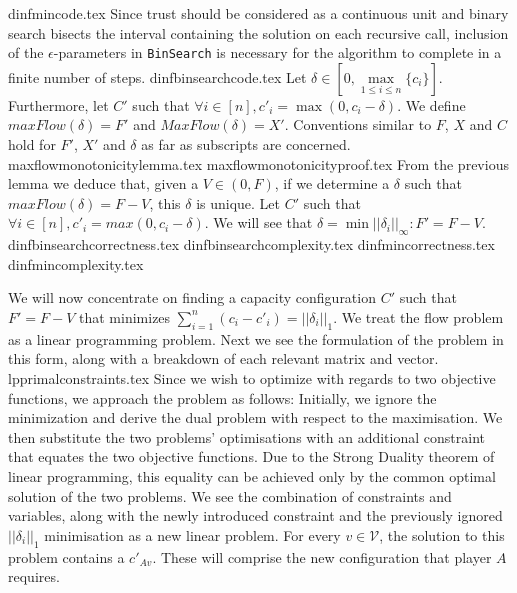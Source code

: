 \documentclass[11pt]{llncs}
\begin{document}
  {dinfmincode.tex}
  Since trust should be considered as a continuous unit and binary search bisects the interval containing the solution
  on each recursive call, inclusion of the $\epsilon$-parameters in \texttt{BinSearch} is necessary for the algorithm to
  complete in a finite number of steps.
  {dinfbinsearchcode.tex}
  Let $\delta \in [0, \max\limits_{1 \leq i \leq n}{\{c_i\}}]$. Furthermore, let $C'$ such that
  $\forall i \in [n], c'_i = \max{\left(0, c_i - \delta\right)}$. We define $maxFlow\left(\delta\right) = F'$ and
  $MaxFlow\left(\delta\right) = X'$. Conventions similar to $F$, $X$ and $C$ hold for $F'$, $X'$ and $\delta$ as far as
  subscripts are concerned.
  {maxflowmonotonicitylemma.tex}
  {maxflowmonotonicityproof.tex}
  From the previous lemma we deduce that, given a $V \in \left(0, F\right)$, if we determine a $\delta$ such that
  $maxFlow\left(\delta\right) = F - V$, this $\delta$ is unique. Let $C'$ such that
  $\forall i \in [n], c'_i = max{\left(0, c_i - \delta\right)}$. We will see that
  $\delta = \min{||\delta_i||_\infty} : F' = F - V$.
  {dinfbinsearchcorrectness.tex}
  {dinfbinsearchcomplexity.tex}
  {dinfmincorrectness.tex}
  {dinfmincomplexity.tex}

  We will now concentrate on finding a capacity configuration $C'$ such that $F' = F - V$ that minimizes
  $\sum\limits_{i=1}^{n}\left(c_i-c'_i\right) = ||\delta_i||_1$. We treat the flow problem as a linear programming problem.
  Next we see the formulation of the problem in this form, along with a breakdown of each relevant matrix and vector.
  {lpprimalconstraints.tex}
  Since we wish to optimize with regards to two objective functions, we approach the problem as follows: Initially, we ignore
  the minimization and derive the dual problem with respect to the maximisation. We then substitute the two problems'
  optimisations with an additional constraint that equates the two objective functions. Due to the Strong Duality theorem of
  linear programming, this equality can be achieved only by the common optimal solution of the two problems. We see the
  combination of constraints and variables, along with the newly introduced constraint and the previously ignored
  $||\delta_i||_1$ minimisation as a new linear problem. For every $v \in \mathcal{V}$, the solution to this problem contains
  a $c'_{Av}$. These will comprise the new configuration that player $A$ requires.
\end{document}
